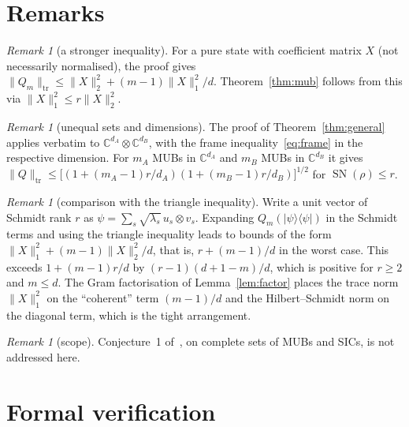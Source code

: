\documentclass[11pt]{amsart}
\theoremstyle{definition}
\theoremstyle{remark}
\newtheorem{remark}[theorem]{Remark}
\newcommand{\C}{\mathbb{C}}
\newcommand{\SN}{\operatorname{SN}}
\newcommand{\tr}{\mathrm{tr}}
\newcommand{\ket}[1]{|#1\rangle}
\newcommand{\bra}[1]{\langle #1|}
\begin{document}
\section{Remarks}\label{sec:remarks}

\begin{remark}[a stronger inequality]
For a pure state with coefficient matrix $X$ (not necessarily normalised), the proof gives
$\|Q_m\|_{\tr}\le\|X\|_2^2+(m-1)\|X\|_1^2/d$. Theorem~\ref{thm:mub} follows from this via
$\|X\|_1^2\le r\|X\|_2^2$.
\end{remark}

\begin{remark}[unequal sets and dimensions]
The proof of Theorem~\ref{thm:general} applies verbatim to $\C^{d_A}\otimes\C^{d_B}$, with the frame
inequality~\eqref{eq:frame} in the respective dimension. For $m_A$ MUBs in $\C^{d_A}$ and $m_B$ MUBs in $\C^{d_B}$
it gives
$\|Q\|_{\tr}\le\bigl[(1+(m_A-1)r/d_A)(1+(m_B-1)r/d_B)\bigr]^{1/2}$ for $\SN(\rho)\le r$.
\end{remark}

\begin{remark}[comparison with the triangle inequality]\label{rem:triangle}
Write a unit vector of Schmidt rank $r$ as $\psi=\sum_s\sqrt{\lambda_s}\,u_s\otimes v_s$. Expanding
$Q_m(\ket\psi\bra\psi)$ in the Schmidt terms and using the triangle inequality leads to bounds of the form
$\|X\|_1^2+(m-1)\|X\|_2^2/d$, that is, $r+(m-1)/d$ in the worst case. This exceeds
$1+(m-1)r/d$ by $(r-1)(d+1-m)/d$, which is positive for $r\ge2$ and $m\le d$. The Gram factorisation of
Lemma~\ref{lem:factor} places the trace norm $\|X\|_1^2$ on the ``coherent'' term $(m-1)/d$ and the
Hilbert--Schmidt norm on the diagonal term, which is the tight arrangement.
\end{remark}

\begin{remark}[scope]
Conjecture~1 of~\cite{TavakoliMorelli2024}, on complete sets of MUBs and SICs, is not addressed here.
\end{remark}

\section{Formal verification}\label{sec:lean}
\end{document}
